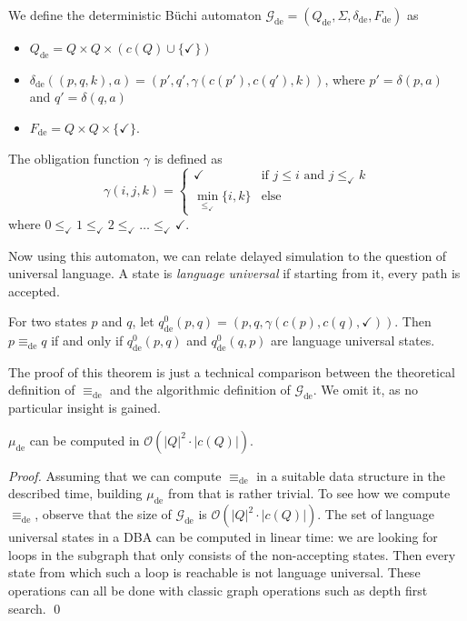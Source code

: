 \begin{definition}
	We define the deterministic B\"uchi automaton $\mathcal{G}_\text{de} = (Q_\text{de}, \Sigma, \delta_\text{de}, F_\text{de})$ as 
	\begin{itemize}
		\item $Q_\text{de} = Q \times Q \times (c(Q) \cup \{\checkmark\})$
		\item $\delta_\text{de}((p, q, k), a) = (p', q', \gamma(c(p'), c(q'), k))$, where $p' = \delta(p, a)$ and $q' = \delta(q, a)$
		\item $F_\text{de} = Q \times Q \times \{\checkmark\}$.
	\end{itemize}

	The obligation function $\gamma$ is defined as $$\gamma(i, j, k) = \begin{cases}
		\checkmark & \text{if } j \leq i \text{ and } j \leq_\checkmark k \\
		\min_{\leq_\checkmark} \{i, k\} & \text{else}
	\end{cases}$$ where $0 \leq_\checkmark 1 \leq_\checkmark 2 \leq_\checkmark \dots \leq_\checkmark \checkmark$.
\end{definition}

Now using this automaton, we can relate delayed simulation to the question of universal language. A state is \emph{language universal} if starting from it, every path is accepted.

\begin{theorem}
	For two states $p$ and $q$, let $q_\text{de}^0(p, q) = (p, q, \gamma(c(p), c(q), \checkmark))$. Then $p \equiv_\text{de} q$ if and only if $q_\text{de}^0(p, q)$ and $q_\text{de}^0(q, p)$ are language universal states.
	\label{thm:Gde_related}
\end{theorem}

The proof of this theorem is just a technical comparison between the theoretical definition of $\equiv_\text{de}$ and the algorithmic definition of $\mathcal{G}_\text{de}$. We omit it, as no particular insight is gained.


\begin{theorem}
	$\mu_\text{de}$ can be computed in $\mathcal{O}(|Q|^2 \cdot |c(Q)|)$.
\end{theorem}

\begin{proof}
	Assuming that we can compute $\equiv_\text{de}$ in a suitable data structure in the described time, building $\mu_\text{de}$ from that is rather trivial. To see how we compute $\equiv_\text{de}$, observe that the size of $\mathcal{G}_\text{de}$ is $\mathcal{O}(|Q|^2 \cdot |c(Q)|)$. The set of language universal states in a DBA can be computed in linear time: we are looking for loops in the subgraph that only consists of the non-accepting states. Then every state from which such a loop is reachable is not language universal. These operations can all be done with classic graph operations such as depth first search. \qed
\end{proof}
